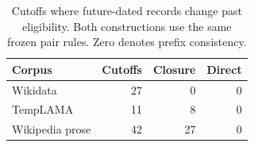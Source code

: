 \begin{table}[t]
\centering
\small
\begin{tabular}{lrrr}
\toprule
Corpus & Cutoffs & Closure & Direct \\
\midrule
Wikidata & 27 & 0 & 0 \\
TempLAMA & 11 & 8 & 0 \\
Wikipedia prose & 42 & 27 & 0 \\
\bottomrule
\end{tabular}
\caption{Cutoffs where future-dated records change past eligibility. Both constructions use the same frozen pair rules. Zero denotes prefix consistency.}
\label{tab:prefix}
\end{table}
